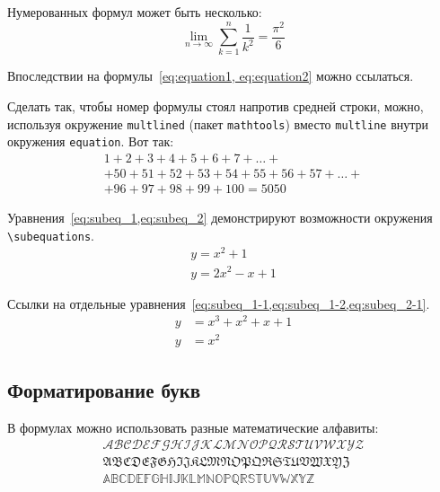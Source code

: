 Нумерованных формул может быть несколько:
\begin{equation}
    \label{eq:equation2}
    \lim_{n \to \infty} \sum_{k=1}^n \frac{1}{k^2} = \frac{\pi^2}{6}
\end{equation}

Впоследствии на формулы~\cref{eq:equation1, eq:equation2} можно ссылаться.

Сделать так, чтобы номер формулы стоял напротив средней строки, можно,
используя окружение \verb|multlined| (пакет \verb|mathtools|) вместо
\verb|multline| внутри окружения \verb|equation|. Вот так:
\begin{equation} %
    \label{eq:equation3}
    \begin{multlined}
        1+ 2+3+4+5+6+7+\dots + \\
        + 50+51+52+53+54+55+56+57 + \dots + \\
        + 96+97+98+99+100=5050
    \end{multlined}
\end{equation}

Уравнения~\cref{eq:subeq_1,eq:subeq_2} демонстрируют возможности
окружения \verb|\subequations|.
\begin{subequations}
    \label{eq:subeq_1}
    \begin{gather}
        y = x^2 + 1 \label{eq:subeq_1-1} \\
        y = 2 x^2 - x + 1 \label{eq:subeq_1-2}
    \end{gather}
\end{subequations}

Ссылки на отдельные уравнения~\cref{eq:subeq_1-1,eq:subeq_1-2,eq:subeq_2-1}.
\begin{subequations}
    \label{eq:subeq_2}
    \begin{align}
        y & = x^3 + x^2 + x + 1 \label{eq:subeq_2-1} \\
        y & = x^2
    \end{align}
\end{subequations}

\subsection{Форматирование букв}

В формулах можно использовать разные математические алфавиты:
\begin{align}
    \mathcal{ABCDEFGHIJKLMNOPQRSTUVWXYZ} \nonumber  \\
    \mathfrak{ABCDEFGHIJKLMNOPQRSTUVWXYZ} \nonumber \\
    \mathbb{ABCDEFGHIJKLMNOPQRSTUVWXYZ} \nonumber
\end{align}

